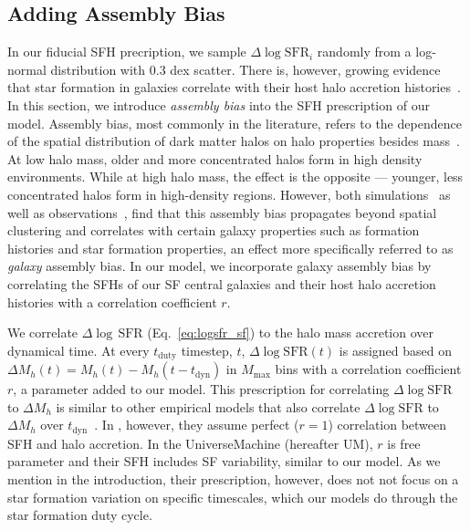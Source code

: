 \documentclass[12pt, letterpaper, preprint, tighten]{aastex62}
\newcommand{\edt}[1]{{\color{dred}{\bf} #1}}
\newcommand{\logsfr}{\log\mathrm{SFR}}
\begin{document}
\subsection{Adding Assembly Bias}
\edt{In our fiducial SFH precription, we sample $\Delta \logsfr_i$ randomly
from a log-normal distribution with $0.3$ dex scatter.}
There is, however, growing evidence that star formation in galaxies correlate with their host
halo accretion histories~\citep[\emph{e.g.}][]{lim2016, tojeiro2017, tinker2018b}.
In this section, we introduce \emph{assembly bias} into the SFH prescription of our 
model. Assembly bias, most commonly in the literature, refers to the dependence of the
spatial distribution of dark matter halos on halo properties besides
mass~\citep{gao2005,wechsler2006,gao2007,wetzel2007,li2008,sunayama2016}.
At low halo mass, older and more concentrated halos form in high density environments.
While at high halo mass, the effect is the opposite --- younger, less concentrated
halos form in high-density regions. However, both
simulations~\citep{croton2007, artale2018, zehavi2018} as well as
observations~\citep{yang2006,wang2008,tinker2011,wang2013,lacerna2014,calderon2018,tinker2018},
find that this assembly bias propagates beyond spatial clustering and correlates
with \edt{certain} galaxy properties such as formation histories and star formation
properties, an effect more specifically referred to as {\em galaxy} assembly bias.
In our model, we incorporate galaxy assembly bias by correlating the SFHs
of our SF central galaxies and their host halo accretion histories
with a correlation coefficient $r$.

We correlate $\Delta\log\,\mathrm{SFR}$ (Eq.~\ref{eq:logsfr_sf}) to the halo 
mass accretion over dynamical time. At every $t_\mathrm{duty}$ timestep, $t$, $
\Delta\logsfr(t)$ is assigned based on 
$\Delta M_h(t) = M_h(t) - M_h(t - t_\mathrm{dyn})$ in $M_\mathrm{max}$ bins
with a correlation coefficient $r$, a parameter added to our model. This
prescription for correlating $\Delta\log\mathrm{SFR}$ to $\Delta M_h$ is
similar to other empirical models that also correlate $\Delta\log\mathrm{SFR}$
to $\Delta M_h$ over $t_\mathrm{dyn}$~\citep{rodriguez-puebla2016a, behroozi2018}.
In \cite{rodriguez-puebla2016a}, however, they assume perfect ($r=1$) correlation
between SFH and halo accretion. In the \cite{behroozi2018} {\sc UniverseMachine}
(hereafter UM), $r$ is free parameter and their SFH includes SF variability,
similar to our model. As we mention in the introduction, their prescription,
however, does not not focus on a star formation variation on specific timescales,
which our models do through the star formation duty cycle.
\end{document}
